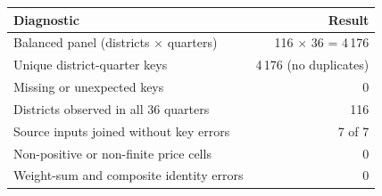 \begin{tabular}{l r}
\toprule
Diagnostic & Result \\
\midrule
Balanced panel (districts $\times$ quarters) & 116 $\times$ 36 = 4\,176 \\
Unique district-quarter keys & 4\,176 (no duplicates) \\
Missing or unexpected keys & 0 \\
Districts observed in all 36 quarters & 116 \\
Source inputs joined without key errors & 7 of 7 \\
Non-positive or non-finite price cells & 0 \\
Weight-sum and composite identity errors & 0 \\
\bottomrule
\end{tabular}
